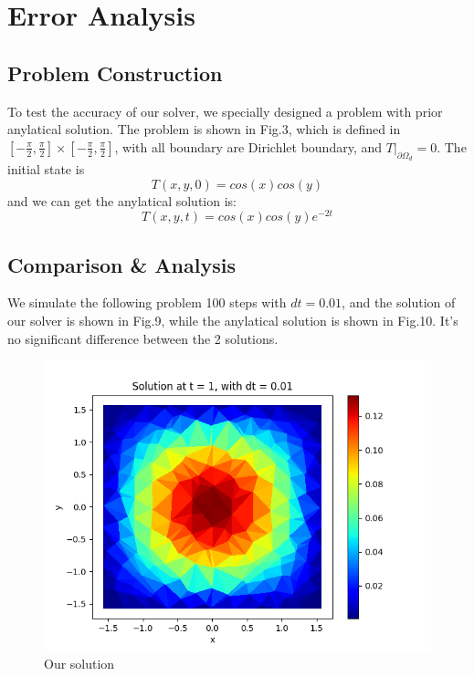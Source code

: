 \documentclass[conference]{IEEEtran}
\begin{document}
\section{Error Analysis}
    \subsection{Problem Construction}
    To test the accuracy of our solver, we specially designed a problem with prior anylatical solution. The problem is 
    shown in Fig.3, which is defined in $[-\frac{\pi}{2} , \frac{\pi}{2}] \times [-\frac{\pi}{2} , \frac{\pi}{2}]$, with 
    all boundary are Dirichlet boundary, and $T\big| _{\partial{\Omega_d}} = 0$. The initial state is
    $$T(x, y, 0) = cos(x)cos(y)$$
    and we can get the anylatical solution is:
    $$T(x, y, t) = cos(x)cos(y)e^{-2t}$$

    \subsection{Comparison \& Analysis}
    We simulate the following problem 100 steps with $dt = 0.01$, and the solution of our solver is shown in Fig.9, 
    while the anylatical solution is shown in Fig.10. It's no significant difference between the 2 solutions.
    \begin{figure}[H]
        \centering
        \includegraphics[scale=0.4]{../fig/sp_sol.png}
        \caption{Our solution}
    \end{figure}
\end{document}
